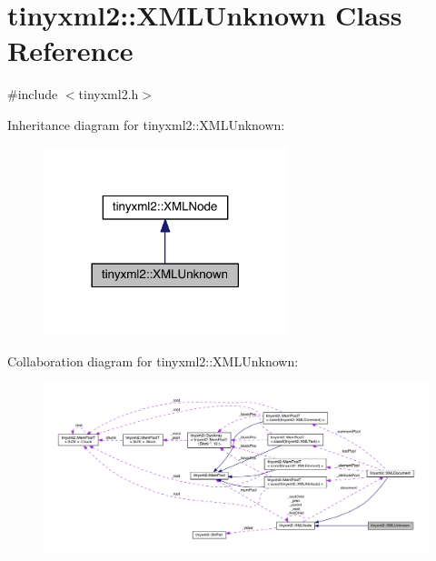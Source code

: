 \hypertarget{classtinyxml2_1_1_x_m_l_unknown}{}\section{tinyxml2\+:\+:X\+M\+L\+Unknown Class Reference}
\label{classtinyxml2_1_1_x_m_l_unknown}


{\ttfamily \#include $<$tinyxml2.\+h$>$}



Inheritance diagram for tinyxml2\+:\+:X\+M\+L\+Unknown\+:\nopagebreak
\begin{figure}[H]
\begin{center}
\leavevmode
\includegraphics[width=201pt]{classtinyxml2_1_1_x_m_l_unknown__inherit__graph}
\end{center}
\end{figure}


Collaboration diagram for tinyxml2\+:\+:X\+M\+L\+Unknown\+:\nopagebreak
\begin{figure}[H]
\begin{center}
\leavevmode
\includegraphics[width=350pt]{classtinyxml2_1_1_x_m_l_unknown__coll__graph}
\end{center}
\end{figure}
